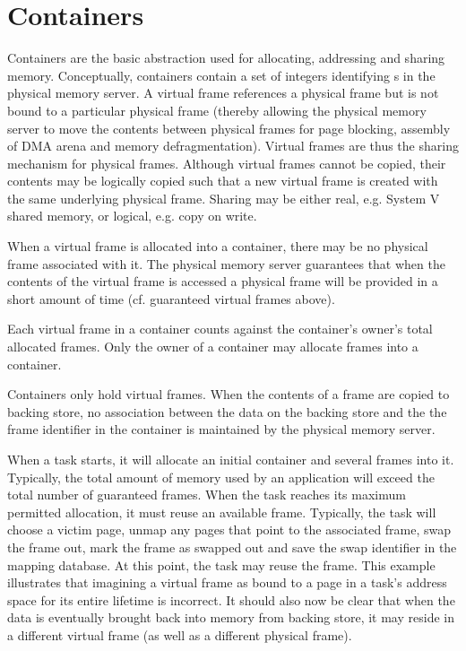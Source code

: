 \section{Containers}

Containers are the basic abstraction used for allocating, addressing
and sharing memory.  Conceptually, containers contain a set of
integers identifying s in the physical memory
server.  A virtual frame references a physical frame but is not bound
to a particular physical frame (thereby allowing the physical memory
server to move the contents between physical frames for page blocking,
assembly of DMA arena and memory defragmentation).  Virtual frames are
thus the sharing mechanism for physical frames.  Although virtual
frames cannot be copied, their contents may be logically copied such
that a new virtual frame is created with the same underlying physical
frame.  Sharing may be either real, e.g. System V shared memory, or
logical, e.g. copy on write.

When a virtual frame is allocated into a container, there may be no
physical frame associated with it.  The physical memory server
guarantees that when the contents of the virtual frame is accessed a
physical frame will be provided in a short amount of time
(cf. guaranteed virtual frames above).

Each virtual frame in a container counts against the container's
owner's total allocated frames.  Only the owner of a container may
allocate frames into a container.

Containers only hold virtual frames.  When the contents of a frame are
copied to backing store, no association between the data on the
backing store and the the frame identifier in the container is
maintained by the physical memory server.

When a task starts, it will allocate an initial container and several
frames into it.  Typically, the total amount of memory used by an
application will exceed the total number of guaranteed frames.  When
the task reaches its maximum permitted allocation, it must reuse an
available frame.  Typically, the task will choose a victim page, unmap
any pages that point to the associated frame, swap the frame out, mark
the frame as swapped out and save the swap identifier in the mapping
database.  At this point, the task may reuse the frame.  This example
illustrates that imagining a virtual frame as bound to a page in a
task's address space for its entire lifetime is incorrect.  It should
also now be clear that when the data is eventually brought back into
memory from backing store, it may reside in a different virtual frame
(as well as a different physical frame).

